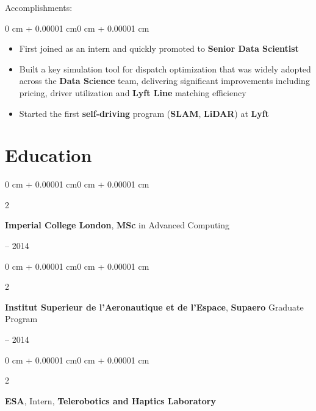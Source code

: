 \documentclass[10pt, letterpaper]{article}
\newenvironment{highlightsforbulletentries}{
    \begin{itemize}[
        topsep=0.10 cm,
        parsep=0.10 cm,
        partopsep=0pt,
        itemsep=0pt,
        leftmargin=1.5 cm
    ]
}{
    \end{itemize}
}
\newenvironment{onecolentry}{
    \begin{adjustwidth}{0 cm + 0.00001 cm}{0 cm + 0.00001 cm}
}{
    \end{adjustwidth}
}
\newenvironment{twocolentry}[2][]{
    \onecolentry
    \def\secondColumn{#2}
    \setcolumnwidth{\fill, 4.5 cm}
    \begin{paracol}{2}
}{
    \switchcolumn \raggedleft \secondColumn
    \end{paracol}
    \endonecolentry
}
\begin{document}
    Accomplishments:
    \begin{onecolentry}
        \begin{highlightsforbulletentries}
            \item First joined as an intern and quickly promoted to \textbf{Senior Data Scientist}
            \item Built a key simulation tool for dispatch optimization that was widely adopted across the \textbf{Data Science} team, delivering significant improvements including pricing, driver utilization and \textbf{Lyft Line} matching efficiency 
            \item Started the first \textbf{self-driving} program (\textbf{SLAM}, \textbf{LiDAR}) at \textbf{Lyft}
        \end{highlightsforbulletentries}
    \end{onecolentry}

    \section{Education}
    \begin{twocolentry}{2013 -- 2014}
        \textbf{Imperial College London}, \textbf{MSc} in Advanced Computing
    \end{twocolentry}

    \begin{twocolentry}{2011 -- 2014}
        \textbf{Institut Superieur de l'Aeronautique et de l'Espace}, \textbf{Supaero} Graduate Program
    \end{twocolentry}

    \begin{twocolentry}{2012}
        \textbf{ESA}, Intern, \textbf{Telerobotics and Haptics Laboratory}
    \end{twocolentry}
\end{document}
